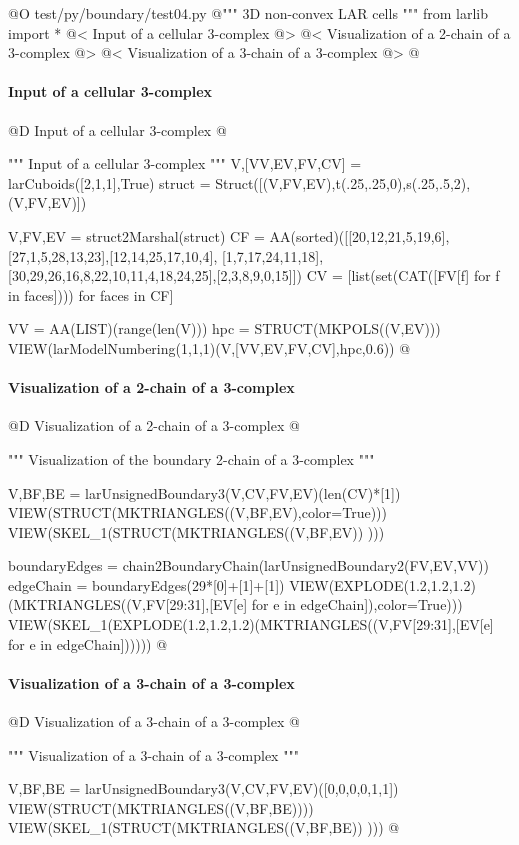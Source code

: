 \documentclass[11pt,oneside]{article}	%
\begin{document}
@O test/py/boundary/test04.py
@{""" 3D non-convex LAR cells """
from larlib import *
@< Input of a cellular 3-complex @>
@< Visualization of a 2-chain of a 3-complex @>
@< Visualization of a 3-chain of a 3-complex @>
@}

\paragraph{Input of a cellular 3-complex}
@D Input of a cellular 3-complex
@{""" Input of a cellular 3-complex """
V,[VV,EV,FV,CV] = larCuboids([2,1,1],True)
struct = Struct([(V,FV,EV),t(.25,.25,0),s(.25,.5,2),(V,FV,EV)])

V,FV,EV = struct2Marshal(struct)
CF = AA(sorted)([[20,12,21,5,19,6],[27,1,5,28,13,23],[12,14,25,17,10,4],
[1,7,17,24,11,18],[30,29,26,16,8,22,10,11,4,18,24,25],[2,3,8,9,0,15]])
CV = [list(set(CAT([FV[f]  for f in faces]))) for faces in CF]

VV = AA(LIST)(range(len(V)))
hpc = STRUCT(MKPOLS((V,EV)))
VIEW(larModelNumbering(1,1,1)(V,[VV,EV,FV,CV],hpc,0.6))
@}


\paragraph{Visualization of a 2-chain of a 3-complex}
@D Visualization of a 2-chain of a 3-complex
@{""" Visualization of the boundary 2-chain of a 3-complex """

V,BF,BE = larUnsignedBoundary3(V,CV,FV,EV)(len(CV)*[1])
VIEW(STRUCT(MKTRIANGLES((V,BF,EV),color=True)))
VIEW(SKEL_1(STRUCT(MKTRIANGLES((V,BF,EV)) )))

boundaryEdges = chain2BoundaryChain(larUnsignedBoundary2(FV,EV,VV))
edgeChain = boundaryEdges(29*[0]+[1]+[1]) 
VIEW(EXPLODE(1.2,1.2,1.2)(MKTRIANGLES((V,FV[29:31],[EV[e] for e in edgeChain]),color=True)))
VIEW(SKEL_1(EXPLODE(1.2,1.2,1.2)(MKTRIANGLES((V,FV[29:31],[EV[e] for e in edgeChain])))))
@}

\paragraph{Visualization of a 3-chain of a 3-complex}
@D Visualization of a 3-chain of a 3-complex
@{""" Visualization of a 3-chain of a 3-complex """

V,BF,BE = larUnsignedBoundary3(V,CV,FV,EV)([0,0,0,0,1,1])
VIEW(STRUCT(MKTRIANGLES((V,BF,BE))))
VIEW(SKEL_1(STRUCT(MKTRIANGLES((V,BF,BE)) )))
@}
\end{document}
